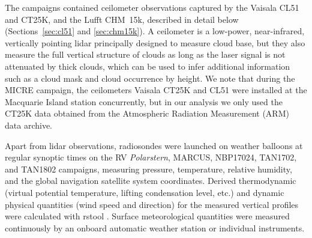 \documentclass[draft]{agujournal2019}
\begin{document}
The campaigns contained ceilometer observations captured by the Vaisala CL51 and CT25K, and the Lufft CHM~15k, described in detail below (Sections~\ref{sec:cl51} and \ref{sec:chm15k}). A ceilometer is a low-power, near-infrared, vertically pointing lidar principally designed to measure cloud base, but they also measure the full vertical structure of clouds as long as the laser signal is not attenuated by thick clouds, which can be used to infer additional information such as a cloud mask and cloud occurrence by height. We note that during the MICRE campaign, the ceilometers Vaisala CT25K and CL51 were installed at the Macquarie Island station concurrently, but in our analysis we only used the CT25K data obtained from the Atmospheric Radiation Measurement (ARM) data archive.

Apart from lidar observations, radiosondes were launched on weather balloons at regular synoptic times on the RV \emph{Polarstern}, MARCUS, NBP17024, TAN1702, and TAN1802 campaigns, measuring pressure, temperature, relative humidity, and the global navigation satellite system coordinates. Derived thermodynamic (virtual potential temperature, lifting condensation level, etc.) and dynamic physical quantities (wind speed and direction) for the measured vertical profiles were calculated with rstool \cite{rstool}. Surface meteorological quantities were measured continuously by an onboard automatic weather station or individual instruments.
\end{document}
